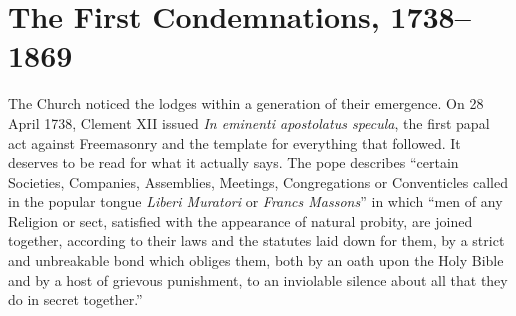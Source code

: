 \section{The First Condemnations, 1738--1869}

The Church noticed the lodges within a generation of their emergence. On 28 April 1738, Clement XII issued \emph{In eminenti apostolatus specula}, the first papal act against Freemasonry and the template for everything that followed. It deserves to be read for what it actually says. The pope describes ``certain Societies, Companies, Assemblies, Meetings, Congregations or Conventicles called in the popular tongue \emph{Liberi Muratori} or \emph{Francs Massons}'' in which ``men of any Religion or sect, satisfied with the appearance of natural probity, are joined together, according to their laws and the statutes laid down for them, by a strict and unbreakable bond which obliges them, both by an oath upon the Holy Bible and by a host of grievous punishment, to an inviolable silence about all that they do in secret together.''

